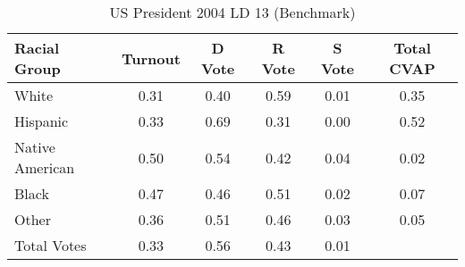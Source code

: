 \begin{table}[htb]
\begin{center}
\caption{US President 2004 LD 13 (Benchmark)}
\label{pres04_cvap_ld_13_benchmark}
\begin{tabular}{lccccc}
  \hline
Racial Group & Turnout & D Vote & R Vote & S Vote & Total CVAP \\ 
  \hline
White & 0.31 & 0.40 & 0.59 & 0.01 & 0.35 \\ 
  Hispanic & 0.33 & 0.69 & 0.31 & 0.00 & 0.52 \\ 
  Native American & 0.50 & 0.54 & 0.42 & 0.04 & 0.02 \\ 
  Black & 0.47 & 0.46 & 0.51 & 0.02 & 0.07 \\ 
  Other & 0.36 & 0.51 & 0.46 & 0.03 & 0.05 \\ 
  Total Votes & 0.33 & 0.56 & 0.43 & 0.01 &  \\ 
   \hline
\end{tabular}
\end{center}
\end{table}
